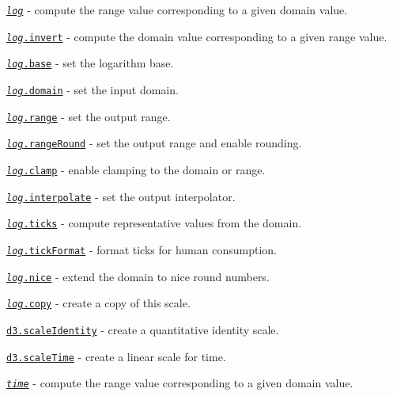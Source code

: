 \begin{DoxyItemize}
\item \href{https://github.com/d3/d3-scale/blob/master/README.md#_log}{\tt {\itshape log}} -\/ compute the range value corresponding to a given domain value.
\item \href{https://github.com/d3/d3-scale/blob/master/README.md#log_invert}{\tt {\itshape log}.invert} -\/ compute the domain value corresponding to a given range value.
\item \href{https://github.com/d3/d3-scale/blob/master/README.md#log_base}{\tt {\itshape log}.base} -\/ set the logarithm base.
\item \href{https://github.com/d3/d3-scale/blob/master/README.md#log_domain}{\tt {\itshape log}.domain} -\/ set the input domain.
\item \href{https://github.com/d3/d3-scale/blob/master/README.md#log_range}{\tt {\itshape log}.range} -\/ set the output range.
\item \href{https://github.com/d3/d3-scale/blob/master/README.md#log_rangeRound}{\tt {\itshape log}.range\+Round} -\/ set the output range and enable rounding.
\item \href{https://github.com/d3/d3-scale/blob/master/README.md#log_clamp}{\tt {\itshape log}.clamp} -\/ enable clamping to the domain or range.
\item \href{https://github.com/d3/d3-scale/blob/master/README.md#log_interpolate}{\tt {\itshape log}.interpolate} -\/ set the output interpolator.
\item \href{https://github.com/d3/d3-scale/blob/master/README.md#log_ticks}{\tt {\itshape log}.ticks} -\/ compute representative values from the domain.
\item \href{https://github.com/d3/d3-scale/blob/master/README.md#log_tickFormat}{\tt {\itshape log}.tick\+Format} -\/ format ticks for human consumption.
\item \href{https://github.com/d3/d3-scale/blob/master/README.md#log_nice}{\tt {\itshape log}.nice} -\/ extend the domain to nice round numbers.
\item \href{https://github.com/d3/d3-scale/blob/master/README.md#log_copy}{\tt {\itshape log}.copy} -\/ create a copy of this scale.
\item \href{https://github.com/d3/d3-scale/blob/master/README.md#identity}{\tt d3.\+scale\+Identity} -\/ create a quantitative identity scale.
\item \href{https://github.com/d3/d3-scale/blob/master/README.md#scaleTime}{\tt d3.\+scale\+Time} -\/ create a linear scale for time.
\item \href{https://github.com/d3/d3-scale/blob/master/README.md#_time}{\tt {\itshape time}} -\/ compute the range value corresponding to a given domain value.

\end{DoxyItemize}
